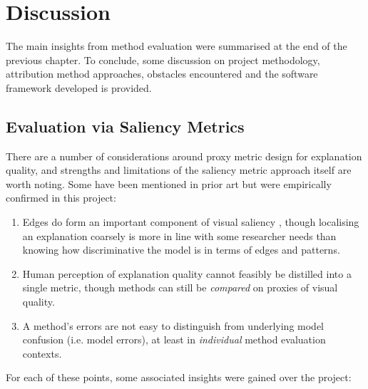 \documentclass[main]{subfiles}
\begin{document}
\chapter{Discussion}

The main insights from method evaluation were summarised at the end of the previous chapter. To conclude, some discussion on project methodology, attribution method approaches, obstacles encountered and the software framework developed is provided.

\section{Evaluation via Saliency Metrics} \label{sec:eval_via_metrics}

There are a number of considerations around proxy metric design for explanation quality, and strengths and limitations of the saliency metric approach itself are worth noting. Some have been mentioned in prior art but were empirically confirmed in this project:
\begin{enumerate}
\item Edges do form an important component of visual saliency \cite{adebayo}, though localising an explanation coarsely is more in line with some researcher needs than knowing how discriminative the model is in terms of edges and patterns.
\item Human perception of explanation quality cannot feasibly be distilled into a single metric, though methods can still be \textit{compared} on proxies of visual quality.
\item A method's errors are not easy to distinguish from underlying model confusion (i.e. model errors), at least in \textit{individual} method evaluation contexts.

\end{enumerate}

\noindent For each of these points, some associated insights were gained over the project:
\end{document}
